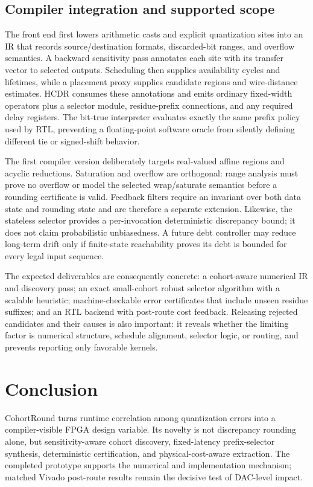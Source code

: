 \documentclass[conference]{IEEEtran}
\begin{document}
\subsection{Compiler integration and supported scope}
The front end first lowers arithmetic casts and explicit quantization sites into
an IR that records source/destination formats, discarded-bit ranges, and
overflow semantics. A backward sensitivity pass annotates each site with its
transfer vector to selected outputs. Scheduling then supplies availability
cycles and lifetimes, while a placement proxy supplies candidate regions and
wire-distance estimates. HCDR consumes these annotations and emits ordinary
fixed-width operators plus a selector module, residue-prefix connections, and
any required delay registers. The bit-true interpreter evaluates exactly the
same prefix policy used by RTL, preventing a floating-point software oracle from
silently defining different tie or signed-shift behavior.

The first compiler version deliberately targets real-valued affine regions and
acyclic reductions. Saturation and overflow are orthogonal: range analysis must
prove no overflow or model the selected wrap/saturate semantics before a
rounding certificate is valid. Feedback filters require an invariant over both
data state and rounding state and are therefore a separate extension. Likewise,
the stateless selector provides a per-invocation deterministic discrepancy
bound; it does not claim probabilistic unbiasedness. A future debt controller
may reduce long-term drift only if finite-state reachability proves its debt is
bounded for every legal input sequence.

The expected deliverables are consequently concrete: a cohort-aware numerical
IR and discovery pass; an exact small-cohort robust selector algorithm with a
scalable heuristic; machine-checkable error certificates that include unseen
residue suffixes; and an RTL backend with post-route cost feedback. Releasing
rejected candidates and their causes is also important: it reveals whether the
limiting factor is numerical structure, schedule alignment, selector logic, or
routing, and prevents reporting only favorable kernels.

\section{Conclusion}
CohortRound turns runtime correlation among quantization errors into a
compiler-visible FPGA design variable. Its novelty is not discrepancy rounding
alone, but sensitivity-aware cohort discovery, fixed-latency prefix-selector
synthesis, deterministic certification, and physical-cost-aware extraction.
The completed prototype supports the numerical and implementation mechanism;
matched Vivado post-route results remain the decisive test of DAC-level impact.



\end{document}
